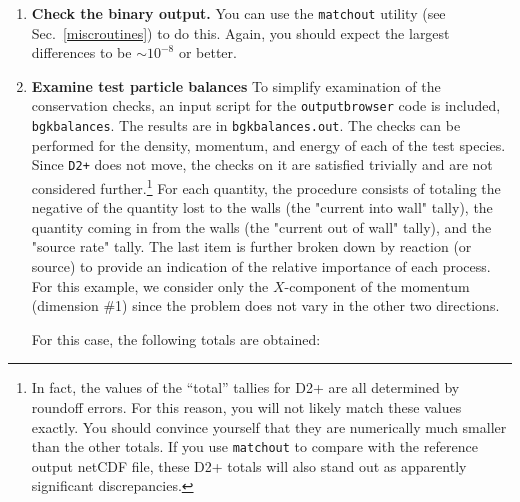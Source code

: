\documentclass[12pt]{report}
\begin{document}
\begin{enumerate}
These files can be directly
compared with the corresponding files in the {\tt examples} directory.
The numbers in the text files have only five
digits of precision and should be matched exactly. The level of agreement
in the netCDF file should be several digits (perhaps as many as 10).
If a satisfactory match is not obtained, something is
amiss. Please contact the code authors (see Sec.~\ref{help}) if you feel
that a problem exists with the code as you downloaded it. 
  \item {\bf Check the binary output.} You can use the {\tt matchout}
utility (see Sec.~\ref{miscroutines}) to do this. Again, you should expect
the largest differences to be $\sim 10^{-8}$ or better.
  \item {\bf Examine test particle balances} To simplify examination 
of the conservation 
checks, an input script for the {\tt outputbrowser} code is included,
{\tt bgkbalances}. The results are in {\tt bgkbalances.out}. The checks can be 
performed for the density, momentum, and energy of each of the test
species. Since \verb-D2+- does not move, the checks on it are satisfied
trivially and are not considered further.\footnote{In fact, the 
values of the ``total'' tallies
for D2+ are all determined by roundoff errors. For this reason,
you will not likely match these values exactly. You should convince
yourself that they are numerically much smaller than the other totals. If you
use {\tt matchout} to compare with the reference output netCDF file, these
D2+ totals will also stand out as apparently significant discrepancies.}
For each quantity, the
procedure consists of totaling the negative of the quantity lost to the
walls (the "current into wall" tally), the quantity coming in from the
walls (the "current out of wall" tally), and the "source rate" tally.  The
last item is further 
broken down by reaction (or source) to provide an indication of the
relative importance of each process.  For this example, we consider only
the $X$-component of the momentum (dimension \#1) since the problem does not vary
in the other two directions.  

For this case, the following totals are obtained:


\end{enumerate}
\end{document}
